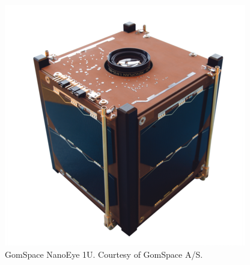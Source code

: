 \documentclass[english,12pt,a4paper,pdftex,elec,utf8]{aaltothesis}
\begin{document}
\begin{center}
\begin{figure}[h!]
\centering
\includegraphics[scale=0.5]{nanoeye}
\caption{GomSpace NanoEye 1U. Courtesy of GomSpace A/S. \cite{gomspaceweb}}
\label{nanoeye}
\end{figure}
\end{center}
\end{document}
